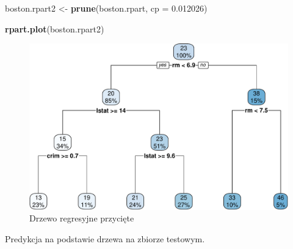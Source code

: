 \documentclass[]{book}
\newenvironment{Shaded}{\begin{snugshade}}{\end{snugshade}}
\newcommand{\ControlFlowTok}[1]{\textcolor[rgb]{0.13,0.29,0.53}{\textbf{#1}}}
\newcommand{\DataTypeTok}[1]{\textcolor[rgb]{0.13,0.29,0.53}{#1}}
\newcommand{\DecValTok}[1]{\textcolor[rgb]{0.00,0.00,0.81}{#1}}
\newcommand{\FloatTok}[1]{\textcolor[rgb]{0.00,0.00,0.81}{#1}}
\newcommand{\KeywordTok}[1]{\textcolor[rgb]{0.13,0.29,0.53}{\textbf{#1}}}
\newcommand{\NormalTok}[1]{#1}
\newcommand{\OperatorTok}[1]{\textcolor[rgb]{0.81,0.36,0.00}{\textbf{#1}}}
\newcommand{\StringTok}[1]{\textcolor[rgb]{0.31,0.60,0.02}{#1}}
\theoremstyle{plain}
\theoremstyle{definition}
\theoremstyle{definition}
\theoremstyle{definition}
\theoremstyle{definition}
\theoremstyle{remark}
\begin{document}
\begin{Shaded}
\begin{Highlighting}[]
\NormalTok{boston.rpart2 <-}\StringTok{ }\KeywordTok{prune}\NormalTok{(boston.rpart, }\DataTypeTok{cp =} \FloatTok{0.012026}\NormalTok{)}
\end{Highlighting}
\end{Shaded}

\begin{Shaded}
\begin{Highlighting}[]
\KeywordTok{rpart.plot}\NormalTok{(boston.rpart2)}
\end{Highlighting}
\end{Shaded}

\begin{figure}
\centering
\includegraphics{EksploracjaDanych_files/figure-latex/unnamed-chunk-34-1.pdf}
\caption{\label{fig:unnamed-chunk-34}Drzewo regresyjne przycięte}
\end{figure}

Predykcja na podstawie drzewa na zbiorze testowym.

\begin{Shaded}
\end{Shaded}
\end{document}
